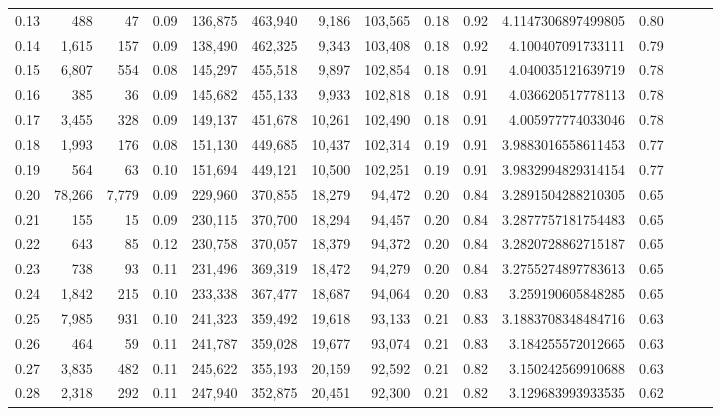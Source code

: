 \begin{tabular}{rrrrrrrrrrrrrrr}
0.13 &     488 &      47 &  0.09 &  136,875 &  463,940 &    9,186 &  103,565 &  0.18 &  0.92 &    4.1147306897499805 &      0.80 \\
0.14 &   1,615 &     157 &  0.09 &  138,490 &  462,325 &    9,343 &  103,408 &  0.18 &  0.92 &     4.100407091733111 &      0.79 \\
0.15 &   6,807 &     554 &  0.08 &  145,297 &  455,518 &    9,897 &  102,854 &  0.18 &  0.91 &     4.040035121639719 &      0.78 \\
0.16 &     385 &      36 &  0.09 &  145,682 &  455,133 &    9,933 &  102,818 &  0.18 &  0.91 &     4.036620517778113 &      0.78 \\
0.17 &   3,455 &     328 &  0.09 &  149,137 &  451,678 &   10,261 &  102,490 &  0.18 &  0.91 &     4.005977774033046 &      0.78 \\
0.18 &   1,993 &     176 &  0.08 &  151,130 &  449,685 &   10,437 &  102,314 &  0.19 &  0.91 &    3.9883016558611453 &      0.77 \\
0.19 &     564 &      63 &  0.10 &  151,694 &  449,121 &   10,500 &  102,251 &  0.19 &  0.91 &    3.9832994829314154 &      0.77 \\
0.20 &  78,266 &   7,779 &  0.09 &  229,960 &  370,855 &   18,279 &   94,472 &  0.20 &  0.84 &    3.2891504288210305 &      0.65 \\
0.21 &     155 &      15 &  0.09 &  230,115 &  370,700 &   18,294 &   94,457 &  0.20 &  0.84 &    3.2877757181754483 &      0.65 \\
0.22 &     643 &      85 &  0.12 &  230,758 &  370,057 &   18,379 &   94,372 &  0.20 &  0.84 &    3.2820728862715187 &      0.65 \\
0.23 &     738 &      93 &  0.11 &  231,496 &  369,319 &   18,472 &   94,279 &  0.20 &  0.84 &    3.2755274897783613 &      0.65 \\
0.24 &   1,842 &     215 &  0.10 &  233,338 &  367,477 &   18,687 &   94,064 &  0.20 &  0.83 &     3.259190605848285 &      0.65 \\
0.25 &   7,985 &     931 &  0.10 &  241,323 &  359,492 &   19,618 &   93,133 &  0.21 &  0.83 &    3.1883708348484716 &      0.63 \\
0.26 &     464 &      59 &  0.11 &  241,787 &  359,028 &   19,677 &   93,074 &  0.21 &  0.83 &     3.184255572012665 &      0.63 \\
0.27 &   3,835 &     482 &  0.11 &  245,622 &  355,193 &   20,159 &   92,592 &  0.21 &  0.82 &     3.150242569910688 &      0.63 \\
0.28 &   2,318 &     292 &  0.11 &  247,940 &  352,875 &   20,451 &   92,300 &  0.21 &  0.82 &     3.129683993933535 &      0.62 \\

\end{tabular}
